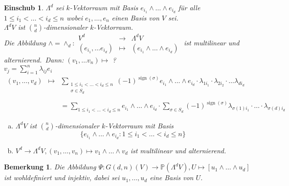 \documentclass[a4paper,12pt]{report}
\theoremstyle{break}
\newtheorem{Bem}[Def]{Bemerkung}
\newtheorem{Einsch}[Def]{Einschub}
\theoremstyle{nonumberbreak}
\theoremstyle{nonumberplain}
\DeclareMathOperator{\sign}{sign}
\newcommand{\IP}{\mathbb{P}}%
\begin{document}
\begin{Einsch}
$\Lambda^d$ sei $k$-Vektorraum mit Basis $e_{i_1}\wedge\ldots \wedge e_{i_d}$ f\"ur alle $1\le i_1 < \ldots < i_d \le n$ wobei $e_1,\ldots ,e_n$ einen Basis von $V$ sei.\\
$\Lambda^dV$ ist $\binom{n}{d}$-dimensionaler $k$-Vektorraum.\\
Die Abbildung $\wedge=\wedge_d:\begin{array}{rcl} V^d &\to& \Lambda^dV\\ (e_{i_1},\ldots e_{i_d}) &\mapsto& (e_{i_1}\wedge\ldots \wedge e_{i_d})\end{array}$ ist multilinear und alternierend.\
\emph{Dann}: $(v_1,\ldots v_n)\mapsto$ ?\\
$v_j=\sum\limits_{i=1}^n\lambda_{ij}e_i$\\
$\begin{array}{rcl}
	(v_1,\ldots ,v_d)&\mapsto& \sum\limits_{\substack{1\le i_1<\ldots <i_d\le n\\\sigma \in S_d}}(-1)^{\sign(\sigma)}e_{i_1}\wedge\ldots \wedge e_{i_d}\cdot \lambda_{1i_1}\cdot \lambda_{2i_2}\cdot\ldots \lambda_{di_d} \\ &&\\ %
	&&= \sum\limits_{1\le i_1 <\ldots <i_d\le n} e_{i_1}\wedge\ldots \wedge e_{i_d}\cdot \sum\limits_{\sigma \in S_d}(-1)^{\sign(\sigma)}\lambda_{\sigma(1)i_1}\cdot \ldots \cdot \lambda_{\sigma(d)i_d}
\end{array}$\begin{enumerate}[a)]

\item
	$\Lambda^dV$ ist $\binom{n}{d}$-dimensionaler $k$-Vektorraum mit Basis
		\[\{  e_{i_1}\wedge\ldots \wedge e_{i_d} : 1\le i_1 <\ldots <i_d\le n \}\]

\item
	$V^d\to \Lambda^dV, (v_1,\ldots ,v_n)\mapsto v_1\wedge\ldots \wedge v_d$ ist multilinear und alternierend.
\end{enumerate}\end{Einsch}

\begin{Bem}
Die Abbildung $\Psi:G(d,n)(V)\to \IP(\Lambda^dV), U\mapsto [u_1\wedge\ldots \wedge u_d]$ ist wohldefiniert und injektiv, dabei sei $u_1,\ldots ,u_d$ eine Basis von $U$.
\end{Bem}
\end{document}

